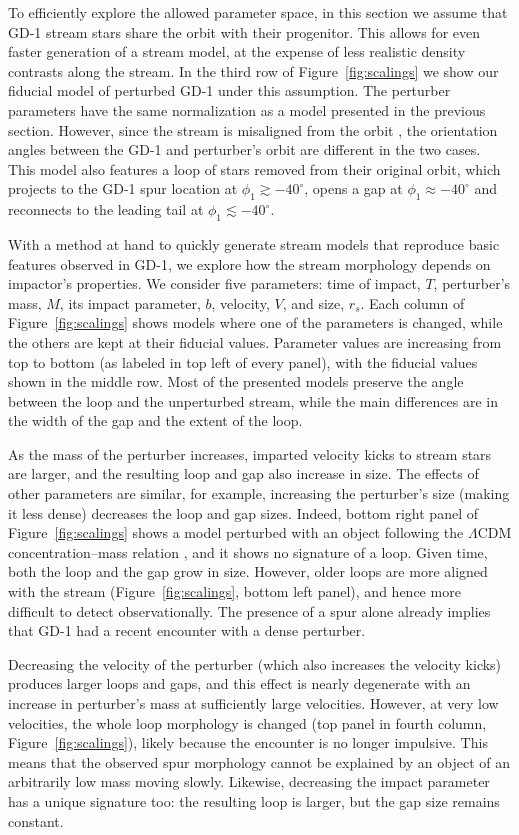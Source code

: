 \documentclass[12pt, modern]{aastex62}
\begin{document}
To efficiently explore the allowed parameter space, in this section we assume that GD-1 stream stars share the orbit with their progenitor.
This allows for even faster generation of a stream model, at the expense of less realistic density contrasts along the stream.
In the third row of Figure~\ref{fig:scalings} we show our fiducial model of perturbed GD-1 under this assumption.
The perturber parameters have the same normalization as a model presented in the previous section.
However, since the stream is misaligned from the orbit \citep{sb2013}, the orientation angles between the GD-1 and perturber's orbit are different in the two cases.
This model also features a loop of stars removed from their original orbit, which projects to the GD-1 spur location at $\phi_1\gtrsim-40^\circ$, opens a gap at $\phi_1\approx-40^\circ$ and reconnects to the leading tail at $\phi_1\lesssim-40^\circ$.

With a method at hand to quickly generate stream models that reproduce basic features observed in GD-1, we explore how the stream morphology depends on impactor's properties.
We consider five parameters: time of impact, $T$, perturber's mass, $M$, its impact parameter, $b$, velocity, $V$, and size, $r_s$.
Each column of Figure~\ref{fig:scalings} shows models where one of the parameters is changed, while the others are kept at their fiducial values.
Parameter values are increasing from top to bottom (as labeled in top left of every panel), with the fiducial values shown in the middle row.
Most of the presented models preserve the angle between the loop and the unperturbed stream, while the main differences are in the width of the gap and the extent of the loop.

As the mass of the perturber increases, imparted velocity kicks to stream stars are larger, and the resulting loop and gap also increase in size.
The effects of other parameters are similar, for example, increasing the perturber's size (making it less dense) decreases the loop and gap sizes.
Indeed, bottom right panel of Figure~\ref{fig:scalings} shows a model perturbed with an object following the $\Lambda$CDM concentration--mass relation \citep{diemer2018}, and it shows no signature of a loop.
Given time, both the loop and the gap grow in size.
However, older loops are more aligned with the stream (Figure~\ref{fig:scalings}, bottom left panel), and hence more difficult to detect observationally.
The presence of a spur alone already implies that GD-1 had a recent encounter with a dense perturber.

Decreasing the velocity of the perturber (which also increases the velocity kicks) produces larger loops and gaps, and this effect is nearly degenerate with an increase in perturber's mass at sufficiently large velocities.
However, at very low velocities, the whole loop morphology is changed (top panel in fourth column, Figure~\ref{fig:scalings}), likely because the encounter is no longer impulsive.
This means that the observed spur morphology cannot be explained by an object of an arbitrarily low mass moving slowly.
Likewise, decreasing the impact parameter has a unique signature too: the resulting loop is larger, but the gap size remains constant.
\end{document}
